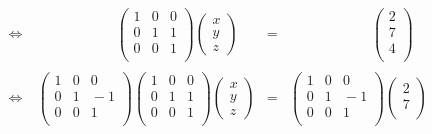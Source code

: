 \begin{example}
\begin{equation*}
\begin{array}{crcr}
\Leftrightarrow\ & %
\phantom{
\begin{pmatrix}
\frac12 & 0 & 0  \\ 
0 & 1 & 0 \\
0& 0 & 1  \\
\end{pmatrix} 
}
\begin{pmatrix}
1 & 0 & 0 \\
0 & 1 & 1  \\ 
0& 0 & 1  \\
\end{pmatrix} 
\begin{pmatrix}
 x \\ 
y \\
z 
\end{pmatrix} 
&=&
\phantom{
\begin{pmatrix}
\frac12 & 0 & 0  \\ 
0 & 1 &  0\\
0& 0 & 1  \\
\end{pmatrix} 
}
~
\begin{pmatrix}
2 \\
7 \\ 
4\\
\end{pmatrix} 
\\[7mm]
\Leftrightarrow\ & %
\begin{pmatrix}
1 & 0 & 0  \\ 
0 & 1 & \!\!\!-1 \\
0& 0 & 1  \\
\end{pmatrix} 
\begin{pmatrix}
1 & 0 & 0 \\
0 & 1 & 1  \\ 
0& 0 & 1  \\
\end{pmatrix} 
\begin{pmatrix}
 x \\ 
y \\
z 
\end{pmatrix} 
&=&
\begin{pmatrix}
1 & 0 & 0  \\ 
0 & 1 & \!\! \!-1\\
0& 0  &  1  \\
\end{pmatrix} 
\! \!
\begin{pmatrix}
2 \\
7 \\ 

\end{pmatrix}
\end{array}
\end{equation*}
\end{example}
